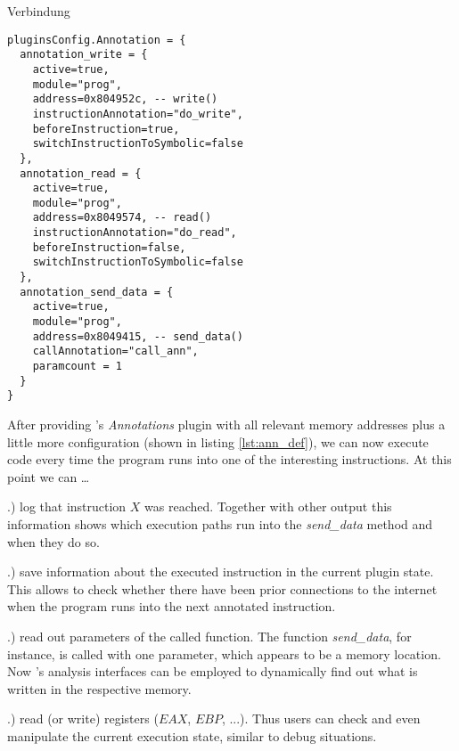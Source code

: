 Verbindung

\bigskip
\begin{lstlisting}[language={[5.0]Lua}, basicstyle=\ttfamily\footnotesize, caption={Configuration of the \textit{Annotations} plugin (part). Defines the instructions to be monitored and actions to trigger upon execution of these instructions. Note the link to the binary in listing \ref{lst:ass} via memory addresses.}, label={lst:ann_def}]
pluginsConfig.Annotation = {
  annotation_write = {
    active=true,
    module="prog",
    address=0x804952c, -- write()
    instructionAnnotation="do_write",
    beforeInstruction=true,
    switchInstructionToSymbolic=false
  },
  annotation_read = {
    active=true,
    module="prog",
    address=0x8049574, -- read()
    instructionAnnotation="do_read",
    beforeInstruction=false, 
    switchInstructionToSymbolic=false
  },
  annotation_send_data = {
    active=true,
    module="prog",
    address=0x8049415, -- send_data()
    callAnnotation="call_ann",
    paramcount = 1
  }
}
\end{lstlisting}
\bigskip


After providing \sse's \textit{Annotations} plugin with all relevant memory addresses plus a little more configuration (shown in listing \ref{lst:ann_def}), we can now execute code every time the program runs into one of the interesting instructions.
At this point we can \ldots

.) log that instruction $X$ was reached.
Together with other \sse output this information shows which execution paths run into the \textit{send\_data} method and when they do so.

.) save information about the executed instruction in the current plugin state.
This allows to check whether there have been prior connections to the internet when the program runs into the next annotated instruction.

.) read out parameters of the called function.
The function \textit{send\_data}, for instance, is called with one parameter, which appears to be a memory location.
Now \sse's analysis interfaces can be employed to dynamically find out what is written in the respective memory.

.) read (or write) registers ($EAX$, $EBP$, ...).
Thus \sse users can check and even manipulate the current execution state, similar to debug situations.

